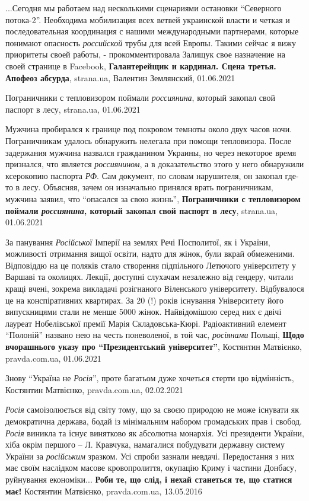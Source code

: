 ...Сегодня мы работаем над несколькими сценариями остановки \enquote{Северного
потока-2}.  Необходима мобилизация всех ветвей украинской власти и четкая и
последовательная координация с нашими международными партнерами, которые
понимают опасность \emph{российской} трубы для всей Европы. Такими сейчас я
вижу приоритеты своей работы, - прокомментировала Залищук свое назначение на
своей странице в Facebook, 
\textbf{Галантерейщик и кардинал. Сцена третья. Апофеоз абсурда}, strana.ua, Валентин Землянский, 01.06.2021

Пограничники с тепловизором поймали \emph{россиянина}, который закопал свой
паспорт в лесу, strana.ua, 01.06.2021

Мужчина пробирался к границе под покровом темноты около двух часов ночи.
Пограничникам удалось обнаружить нелегала при помощи тепловизора.  После
задержания мужчина назвался гражданином Украины, но через некоторое время
признался, что является \emph{россиянином}, а в доказательство этого у него
обнаружили ксерокопию паспорта \emph{РФ}. Сам документ, по словам нарушителя,
он закопал где-то в лесу. Объясняя, зачем он изначально принялся врать
пограничникам, мужчина заявил, что \enquote{опасался за свою жизнь},
\textbf{Пограничники с тепловизором поймали \emph{россиянина}, который закопал
свой паспорт в лесу}, strana.ua, 01.06.2021

За панування \emph{Російської} Імперії на землях Речі Посполитої, як і України,
можливості отримання вищої освіти, надто для жінок, були вкрай обмеженими.
Відповіддю на це поляків стало створення підпільного Летючого університету у
Варшаві та околицях. Лекції, доступні слухачам незалежно від гендеру, читали
кращі вчені, зокрема викладачі розігнаного Віленського університету.
Відбувалося це на конспіративних квартирах. За 20 (!) років існування
Університету його випускницями стали не менше 5000 жінок. Найвідомішою серед
них є двічі лауреат Нобелівської премії Марія Складовська-Кюрі. Радіоактивний
елемент \enquote{Полоній} названо нею на честь поневоленої, в той час, \emph{росіянами}
Польщі, 
\textbf{Щодо вчорашнього указу про \enquote{Президентський університет}}, Костянтин Матвієнко, pravda.com.ua, 01.06.2021

Знову \enquote{Україна не \emph{Росія}}, проте багатьом дуже хочеться стерти цю відмінність,
Костянтин Матвієнко, pravda.com.ua, 02.02.2021

\emph{Росія} самоізолюється від світу тому, що за своєю природою не може існувати як
демократична держава, бодай із мінімальним набором громадських прав і свобод.
\emph{Росія} виникла та існує винятково як абсолютна монархія. Усі президенти України,
хіба окрім першого – Л. Кравчука, намагалися побудувати державну систему
України за \emph{російським} зразком. Усі спроби зазнали невдачі. Передостання з них
має своїм наслідком масове кровопролиття, окупацію Криму і частини Донбасу,
руйнування економіки...
\textbf{Роби те, що слід, і нехай станеться те, що статися має!}
Костянтин Матвієнко, pravda.com.ua, 13.05.2016

